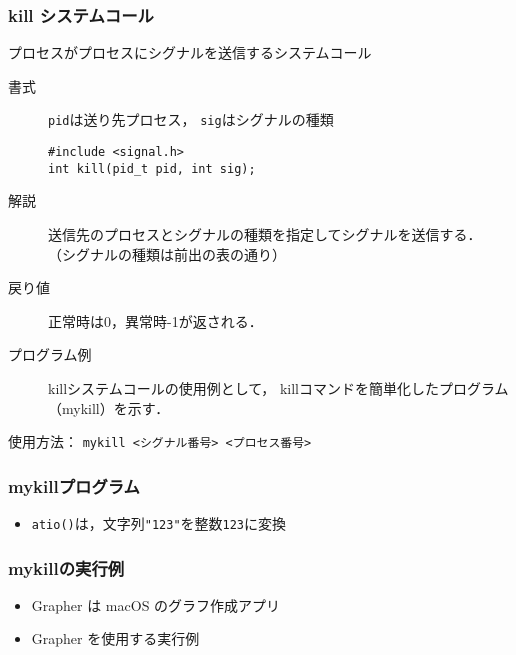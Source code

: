 \documentclass{beamer}                 %
\begin{document}
\begin{frame}[fragile]
  \frametitle{kill システムコール}
  プロセスがプロセスにシグナルを送信するシステムコール

  \begin{description}
  \item[書式] \texttt{pid}は送り先プロセス，
    \texttt{sig}はシグナルの種類

\begin{verbatim}
#include <signal.h>
int kill(pid_t pid, int sig);
\end{verbatim}

  \item[解説]
    送信先のプロセスとシグナルの種類を指定してシグナルを送信する．
    （シグナルの種類は前出の表の通り）

  \item[戻り値]
    正常時は0，異常時-1が返される．

  \item[プログラム例]
    killシステムコールの使用例として，
    killコマンドを簡単化したプログラム（mykill）を示す．\\
  \end{description}
  \begin{center}
    使用方法： \texttt{mykill <シグナル番号> <プロセス番号>}
  \end{center}
\end{frame}

\begin{frame}[fragile]
  \frametitle{mykillプログラム}
  \begin{quote}
  \end{quote}

  \begin{itemize}
  \item \texttt{atio()}は，文字列\texttt{"123"}を整数\texttt{123}に変換
  \end{itemize}
\end{frame}

\begin{frame}[fragile]
  \frametitle{mykillの実行例}
  \begin{quote}
  \end{quote}

  \begin{itemize}
  \item Grapher は macOS のグラフ作成アプリ
  \item Grapher を使用する実行例
  \end{itemize}
\end{frame}
\end{document}
